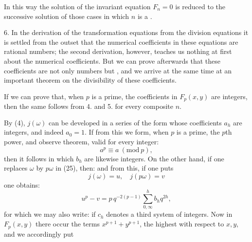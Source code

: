 In this way the solution of the invariant equation $F_n = 0$ is reduced to the successive solution of those cases in which $n$ is a .

6. In the derivation of the transformation equations from the division equations it is settled from the outset that the numerical coefficients in these equations are rational numbers; the second derivation, however, teaches us nothing at first about the numerical coefficients. But we can prove afterwards that these coefficients are not only  numbers but , and we arrive at the same time at an important theorem on the divisibility of these coefficients.

If we can prove that, when $p$ is a prime, the coefficients in $F_p(x, y)$ are integers, then the same follows from 4. and 5. for every composite $n$.

By (4), $j(\omega)$ can be developed in a series of the form
whose coefficients $a_h$ are integers, and indeed $a_0 = 1$.
If from this we form, when $p$ is a prime, the $p$th power, and observe  theorem, valid for every integer:
\[
a^p \equiv a\ (\mathrm{mod}\ p),
\]
then it follows
in which $b_h$ are likewise integers. On the other hand, if one replaces $\omega$ by $p\omega$ in (25), then:
and from this, if one puts
\[
j(\omega) = u, \quad j(p\omega) = v
\]
one obtains:
\[
u^p - v = p\, q^{-2(p-1)} \sum_{0,\infty}^{h} b_h q^{2h},
\]
for which we may also write:
if $c_h$ denotes a third system of integers.
Now in $F_p(x, y)$ there occur the terms $x^{p+1} + y^{p+1}$, the highest with respect to $x, y$, and we accordingly put

